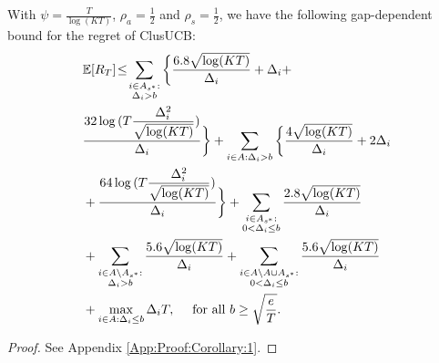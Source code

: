 \begin{corollary}
\label{Result:Corollary:1}
With $\psi=\frac{T}{\log (KT)}$, $\rho_{a}=\frac{1}{2}$ and $\rho_{s}=\frac{1}{2}$,  we have the following gap-dependent bound for the regret of ClusUCB:
\begin{align*}
&\mathbb{E} [R_T] \!\le\! 
\sum_{\substack{i\in A_{s^{*}}:\\\Delta_{i} > b}}\bigg\lbrace \dfrac{6.8\sqrt{\log (KT)}}{\Delta_{i}} + \Delta_{i} + \\
& \dfrac{32\log{(T\dfrac{\Delta_{i}^{2}}{\sqrt{\log (KT)}})}}{\Delta_{i}} \bigg\rbrace + \sum_{i\in A:\Delta_{i} > b}\bigg\lbrace\dfrac{4\sqrt{\log (KT)}}{\Delta_{i}} + 2\Delta_{i} \\
& + \dfrac{64\log{(T\dfrac{\Delta_{i}^{2}}{\sqrt{\log (KT)}})}}{\Delta_{i}}\bigg\rbrace
	  + \sum\limits_{\substack{i\in A_{s^{*}}:\\0< \Delta_{i} \leq b}}\dfrac{2.8\sqrt{\log (KT)}}{\Delta_{i}}\\
	& + \sum\limits_{\substack{i\in A\setminus A_{s^{*}}:\\\Delta_{i} > b}}\dfrac{5.6\sqrt{\log (KT)}}{\Delta_{i}} + \sum\limits_{\substack{i\in A\setminus A \cup A_{s^{*}}:\\0 < \Delta_{i}\leq b}}\dfrac{5.6\sqrt{\log (KT)}}{\Delta_{i}} \\
	& + \max\limits_{i\in A:\Delta_{i}\leq b}\Delta_{i}T, \quad \text{ for all }b\geq \sqrt{\frac{e}{T}}.
	\end{align*} 
\end{corollary}
\begin{proof}
 See Appendix \ref{App:Proof:Corollary:1}.
\end{proof}

